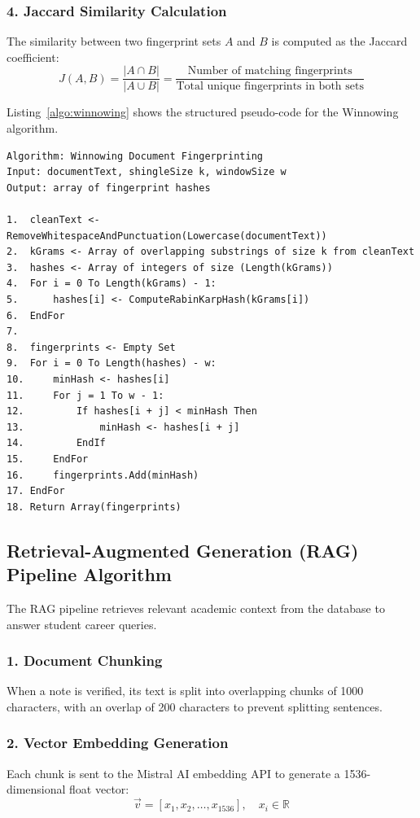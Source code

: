\documentclass[12,Times new Roman,a4paper]{report}
\begin{document}
\subsubsection*{4. Jaccard Similarity Calculation}
The similarity between two fingerprint sets $A$ and $B$ is computed as the Jaccard coefficient:
\begin{equation}
J(A, B) = \frac{|A \cap B|}{|A \cup B|} = \frac{\text{Number of matching fingerprints}}{\text{Total unique fingerprints in both sets}}
\end{equation}

Listing~\ref{algo:winnowing} shows the structured pseudo-code for the Winnowing algorithm.

\begin{verbatim}
Algorithm: Winnowing Document Fingerprinting
Input: documentText, shingleSize k, windowSize w
Output: array of fingerprint hashes

1.  cleanText <- RemoveWhitespaceAndPunctuation(Lowercase(documentText))
2.  kGrams <- Array of overlapping substrings of size k from cleanText
3.  hashes <- Array of integers of size (Length(kGrams))
4.  For i = 0 To Length(kGrams) - 1:
5.      hashes[i] <- ComputeRabinKarpHash(kGrams[i])
6.  EndFor
7.  
8.  fingerprints <- Empty Set
9.  For i = 0 To Length(hashes) - w:
10.     minHash <- hashes[i]
11.     For j = 1 To w - 1:
12.         If hashes[i + j] < minHash Then
13.             minHash <- hashes[i + j]
14.         EndIf
15.     EndFor
16.     fingerprints.Add(minHash)
17. EndFor
18. Return Array(fingerprints)
\end{verbatim}
\label{algo:winnowing}

\subsection{Retrieval-Augmented Generation (RAG) Pipeline Algorithm}

The RAG pipeline retrieves relevant academic context from the database to answer student career queries.

\subsubsection*{1. Document Chunking}
When a note is verified, its text is split into overlapping chunks of 1000 characters, with an overlap of 200 characters to prevent splitting sentences.

\subsubsection*{2. Vector Embedding Generation}
Each chunk is sent to the Mistral AI embedding API to generate a 1536-dimensional float vector:
\begin{equation}
\vec{v} = [x_1, x_2, \dots, x_{1536}], \quad x_i \in \mathbb{R}
\end{equation}
\end{document}

